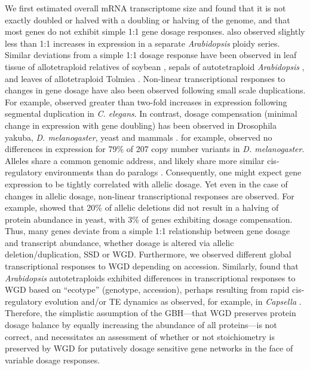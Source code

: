 \documentclass[11pt]{article}
\begin{document}
We first estimated overall mRNA transcriptome size and found that it is not exactly doubled or halved with a doubling or halving of the genome, and that most genes do not exhibit simple 1:1 gene dosage responses.
\cite{hou2018} also observed slightly less than 1:1 increases in expression in a separate \textit{Arabidopsis} ploidy series.
Similar deviations from a simple 1:1 dosage response have been observed in leaf tissue of allotetraploid relatives of soybean \citep{coate2010}, sepals of autotetraploid \textit{Arabidopsis} \citep{robinson2018}, and leaves of allotetraploid Tolmiea \citep{visger2019}.
Non-linear transcriptional responses to changes in gene dosage have also been observed following small scale duplications.
For example, \cite{konrad2018} observed greater than two-fold increases in expression following segmental duplication in \textit{C. elegans}.
In contrast, dosage compensation (minimal change in expression with gene doubling) has been observed in Drosophila yakuba, \textit{D. melanogaster}, yeast and mammals \citep{qian2010, rogers2017, zhou2011}.
\cite{zhou2011} for example, observed no differences in expression for 79\% of 207 copy number variants in \textit{D. melanogaster}.\\

Alleles share a common genomic address, and likely share more similar cis-regulatory environments than do paralogs \citep{gabaldon2013}.
Consequently, one might expect gene expression to be tightly correlated with allelic dosage.
Yet even in the case of changes in allelic dosage, non-linear transcriptional responses are observed.
For example, \cite{springer2010} showed that 20\% of allelic deletions did not result in a halving of protein abundance in yeast, with 3\% of genes exhibiting dosage compensation.
Thus, many genes deviate from a simple 1:1 relationship between gene dosage and transcript abundance, whether dosage is altered via allelic deletion/duplication, SSD or WGD.
Furthermore, we observed different global transcriptional responses to WGD depending on accession.
Similarly, \cite{yu2010} found that \textit{Arabidopsis} autotetraploids exhibited differences in transcriptional responses to WGD based on ``ecotype'' (genotype, accession), perhaps resulting from rapid cis-regulatory evolution and/or TE dynamics as observed, for example, in \textit{Capsella} \citep{steige2015}.
Therefore, the simplistic assumption of the GBH---that WGD preserves protein dosage balance by equally increasing the abundance of all proteins---is not correct, and necessitates an assessment of whether or not stoichiometry is preserved by WGD for putatively dosage sensitive gene networks in the face of variable dosage responses.\\
\end{document}
